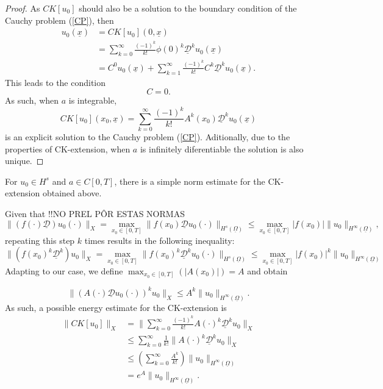 \documentclass[12pt]{amsart}
\newcommand{\D}{\mathcal{D}}
\newcommand{\norm}[1]{|#1|}
\newcommand{\dnorm}[2]{\|#1\|_{#2}}
\newcommand{\hnorm}[2]{\dnorm{#1}{H^{#2}(\un\Omega)}}
\theoremstyle{definition}
\newcommand{\un}{\underline}
\begin{document}
\begin{proof}
As $CK[u_0]$ should also be a solution to the boundary condition of the Cauchy problem (\ref{CP}), then
\begin{align*}
    u_0(\un x) 
    &= CK[u_0](0, \un x)\\
    &=\sum_{k = 0}^\infty \frac{(-1)^k}{k!}\phi(0)^k\un{\D}^ku_0(\un{x})\\
    &= C^0u_0(\un{x})+ \sum_{k = 1}^\infty \frac{(-1)^k}{k!}C^k\un{\D}^ku_0(\un{x}).
\end{align*}
This leads to the condition %
\[
C = 0.
\]
As such, when $a$ is integrable, %
\[
CK[u_0](x_0, \un{x}) = \sum_{k = 0}^\infty \frac{(-1)^k}{k!}A^k(x_0)\un{\D}^ku_0(\un{x})
\]
is an explicit solution to the Cauchy problem (\ref{CP}). Aditionally, due to the properties of CK-extension, when $a$ is infinitely diferentiable the solution is also unique. 
\end{proof}
For $u_0 \in H^s$ and $a \in C[0,T]$, there is a simple norm estimate for the CK-extension obtained above.

Given that  !!NO PREL PÔR ESTAS NORMAS
\[
\|{(f(\cdot)\un{\D})u_0(\cdot)}\|_X = \max_{x_0 \in [0,T]}\hnorm{f(x_0)\un{\D}u_0(\cdot)}{s} %
\leq \max_{x_0 \in [0,T]}|f(x_0)|\hnorm{u_0}{\infty},
\]
repeating this step $k$ times results in the following inequality:
\[
\|{(f(x_0)^k\un{\D}^k)u_0}\|_X = \max_{x_0 \in [0,T]}\hnorm{f(x_0)^k\un{\D}^ku_0(\cdot)}{s} %
\leq \max_{x_0 \in [0,T]}|f(x_0)|^k\hnorm{u_0}{\infty}
\]
Adapting to our case, we define $\max_{x_0 \in [0, T]} (\norm{A(x_0)}) = A$ and obtain

\[
\|(A(\cdot)\un{\D}u_0(\cdot))^k u_0\|_X  \leq A^k \hnorm{u_0}{\infty}.
\]
As such, a possible energy estimate for the CK-extension is 
\begin{align*}
\| CK[u_0]\|_{X}    &= \| \sum_{k = 0}^\infty \frac{(-1)^k}{k!}A(\cdot)^k\un{\D}^ku_0\|_{X} \\
        &\leq \sum_{k = 0}^\infty \frac{1}{k!}\|A(\cdot)^k\un{\D}^ku_0\|_{X} \\
        &\leq  \left( \sum_{k = 0}^\infty \frac{A^k}{k!} \right) \hnorm{u_0}{\infty}\\
        &= e^{A}\hnorm{u_0}{\infty}.
\end{align*}
\end{document}
